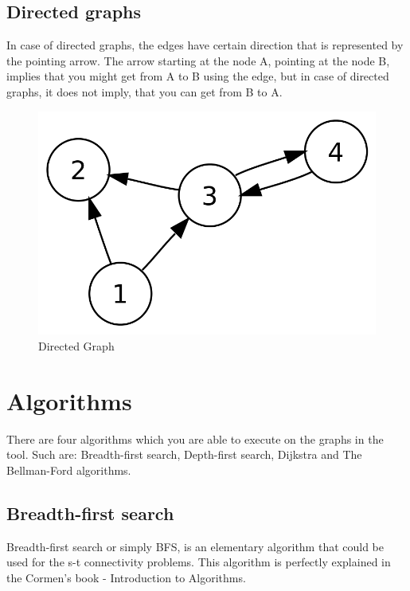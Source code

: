 \subsection{Directed graphs}

In case of directed graphs, the edges have certain direction that is represented by the pointing arrow. The arrow starting at the node A, pointing at the node B, implies that you might get from A to B using the edge, but in case of directed graphs, it does not imply, that you can get from B to A.

\begin{figure}[H]
	\centering
	\includegraphics[width=120mm]{images/Directed_graph_image.png}
	\caption{Directed Graph}
\end{figure}

\section{Algorithms}

There are four algorithms which you are able to execute on the graphs in the tool. Such are: Breadth-first search, Depth-first search, Dijkstra and The Bellman-Ford algorithms.

\subsection{Breadth-first search}

Breadth-first search or simply BFS, is an elementary algorithm that could be used for the s-t connectivity problems. This algorithm is perfectly explained in the Cormen's book - Introduction to Algorithms.

